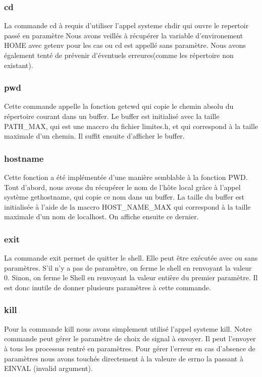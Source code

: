 \documentclass[12pt]{article}
\begin{document}
 \subsubsection{cd}
 La commande cd à requis d'utiliser l'appel systeme chdir qui ouvre le repertoir passé en paramètre
 Nous avons veillés à récupérer la variable d'environement HOME avec getenv pour les cas ou cd est
 appellé sans paramètre. Nous avons également tenté de prévenir d'éventuels erreures(comme les
 répertoire non existant).
 
 \subsubsection{pwd}
 Cette commande appelle la fonction getcwd qui copie le chemin absolu du répertoire courant dans un buffer.
 Le buffer est initialisé avec la taille PATH_MAX, qui est une maccro du fichier limites.h, et qui correspond à la taille maximale d'un chemin. 
 Il suffit ensuite d'afficher le buffer.
 
 \subsubsection{hostname}
 Cette fonction a été implémentée d'une manière semblable à la fonction PWD.
Tout d'abord, nous avons du récupérer le nom de l'hôte local grâce à l'appel système gethostname, qui copie ce nom dans un buffer. 
La taille du buffer est initialisée à l'aide de la maccro HOST_NAME_MAX qui correspond à la taille maximale d'un nom de localhost. 
On affiche ensuite ce dernier.
 
 \subsubsection{exit}
 La commande exit permet de quitter le shell. 
 Elle peut être exécutée avec ou sans paramètres. 
 S'il n'y a pas de paramètre, on ferme le shell en renvoyant la valeur 0. 
 Sinon, on ferme le Shell en renvoyant la valeur entière du premier paramètre. Il est donc inutile de donner plusieurs paramètres à cette commande.
 
 \subsubsection{kill}
 Pour la commande kill nous avons simplement utilisé l'appel systeme kill. 
 Notre commande peut gérer le paramètre de choix de signal à envoyer. Il peut l'envoyer à tous les processus
 rentré en paramètres.
 Pour gérer l'erreur en cas d'absence de paramètres nous avons touchés directement à la valeure
 de errno la passant à EINVAL (invalid argument).
 
\end{document}
